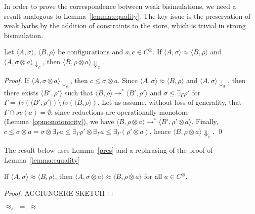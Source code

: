 \documentclass[main.tex]{subfiles}
\begin{document}
In order to prove the correspondence between weak bisimulations, we need a result 
analogous to Lemma~\ref{lemma:equality}. The key issue is the preservation of weak barbs by
the addition of constraints to the store, which is  trivial in strong bisimulation.

\begin{lemma}\label{pres}
Let $\langle A, \sigma \rangle$, $\langle B, \rho \rangle$ be configurations and $a, c \in C^\otimes$.
%
If $\langle A, \sigma \rangle \approx \langle B, \rho \rangle$ and $\langle A, \sigma \otimes a \rangle\downarrow_c$, then $\langle B, \rho \otimes a\rangle\Downarrow_c$.
\end{lemma}

\begin{proof}
	If $\langle A, \sigma \otimes a \rangle \downarrow_c$, then $c \leq \sigma \otimes a$. Since $\langle A, \sigma \rangle \approx \langle B, \rho \rangle$ and $\langle A, \sigma \rangle \downarrow_\sigma$,
	then there exists $\langle B', \rho' \rangle$ such that $\langle B, \rho \rangle  \rightarrow^* \langle B', \rho'\rangle$ and $\sigma \leq \exists_\Gamma \rho'$ for $\Gamma = fv(\langle B', \rho'\rangle) \setminus fv(\langle B, \rho\rangle)$.
	Let us assume, without loss of generality, that $\Gamma \cap sv(a) = \emptyset$;
	since reductions are operationally monotone (Lemma~\ref{opmonotonicity}),
	we  have $\langle B, \rho \otimes a \rangle  \rightarrow^* \langle B', \rho' \otimes a\rangle$. 
	Finally, $c \leq \sigma \otimes a = \sigma \otimes \exists_\Gamma a \leq \exists_\Gamma \rho' \otimes \exists_\Gamma a \leq \exists_\Gamma (\rho' \otimes a)$, hence $\langle B, \rho \otimes a\rangle\Downarrow_c$. \qed
\end{proof}

The result below uses Lemma~\ref{pres} and a rephrasing of the proof of Lemma~\ref{lemma:equality}

\begin{lemma}
If $\langle A, \sigma \rangle \approx \langle B, \rho \rangle$, then $\langle A, \sigma \otimes a \rangle \approx \langle B, \rho \otimes a \rangle$ for all $a \in C^\otimes$.
\end{lemma}
\begin{proof}
AGGIUNGERE SKETCH
\end{proof}

\begin{theorem}
\label{th:wbisimiffwsbbisim}
$\approx_{\mathit{s}} \; = \; \approx$
\end{theorem}
\end{document}
